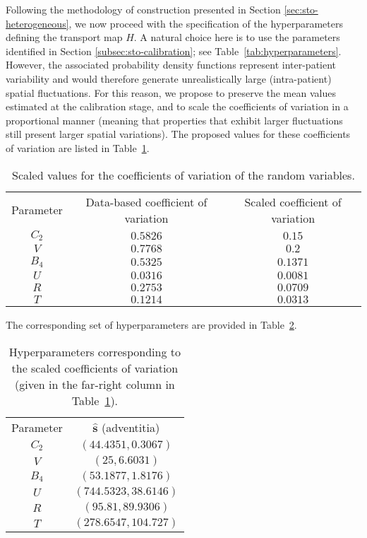 Following the methodology of construction presented in Section \ref{sec:sto-heterogeneous}, we now proceed with the specification of the hyperparameters defining the transport map $H$. A natural choice here is to use the parameters identified in Section \ref{subsec:sto-calibration}; see Table~\ref{tab:hyperparameters}. However, the associated probability density functions represent inter-patient variability and would therefore generate unrealistically large (intra-patient) spatial fluctuations. For this reason, we propose to preserve the mean values estimated at the calibration stage, and to scale the coefficients of variation in a proportional manner (meaning that properties that exhibit larger fluctuations still present larger spatial variations). The proposed values for these coefficients of variation are listed in Table~\ref{tab:scaled-hyperparameters}.
\begin{table}[ht!]
\caption[Scaled coefficients of variation of the random variables.]{Scaled values for the coefficients of variation of the random variables.}
\label{tab:scaled-hyperparameters}
\begin{center}
    \begin{tabular}{|c|c|c|} 
 \hline
 \quad Parameter \quad & \quad Data-based coefficient of variation \quad & \quad Scaled coefficient of variation \quad \\
 \cline{1-3} 
    $C_2$ & $0.5826$  & $0.15$ \\
    $V$   & $0.7768$ & $0.2$ \\
    $B_4$ & $0.5325$ & $0.1371$ \\
    $U$   & $0.0316$ & $0.0081$ \\
    $R$   & $0.2753$  & $0.0709$ \\
    $T$   & $0.1214$ & $0.0313$ \\
 \hline 
 \end{tabular}
\end{center}
\end{table}
The corresponding set of hyperparameters are provided in Table~\ref{tab:hyperparameters-scaled}.
\begin{table}[ht!]
\caption[Hyperparameters corresponding to the scaled coefficients of variation.]{Hyperparameters corresponding to the scaled coefficients of variation (given in the far-right column in Table~\ref{tab:scaled-hyperparameters}).}
\label{tab:hyperparameters-scaled}
\begin{center}
    \begin{tabular}{|c|c|} 
 \hline
 \quad Parameter \quad & \quad $\hat{\boldsymbol{s}}$ (adventitia) \quad \\
 \cline{1-2} 
    $C_2$ & $(44.4351, 0.3067)$\\
    $V$   & $(25, 6.6031)$\\
    $B_4$ & $(53.1877, 1.8176)$\\
    $U$   & $(744.5323, 38.6146)$\\
    $R$   & $(95.81, 89.9306)$\\
    $T$   & $(278.6547, 104.727)$\\
 \hline 
\end{tabular}
\end{center}
\end{table}

